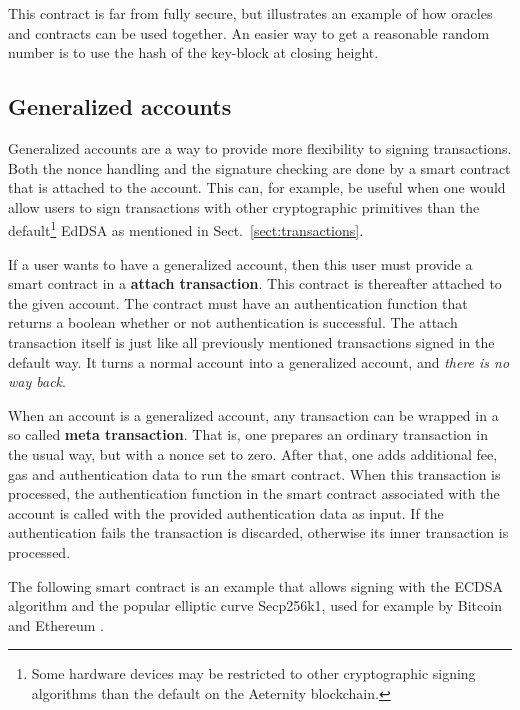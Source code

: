 This contract is far from fully secure, but illustrates an example of
how oracles and contracts can be used together. An easier way to
get a reasonable random number is to use the hash of the key-block at
closing height.




\subsection{Generalized accounts}
\label{sect:ga}

Generalized accounts are a way to provide more flexibility to signing
transactions. Both the nonce handling and the signature checking are
done by a smart contract that is attached to the account. This can,
for example, be useful when one would allow users to sign transactions with
other cryptographic primitives than the default\footnote{Some hardware
  devices may be restricted to other cryptographic signing algorithms
  than the default on the Aeternity blockchain.} EdDSA as mentioned in
Sect.\ \ref{sect:transactions}.

If a user wants to have a generalized account, then this user must
provide a smart contract in a \textbf{attach transaction}. This
contract is thereafter attached to the given account. The contract
must have an authentication function that returns a boolean whether or
not authentication is successful. The attach transaction itself is
just like all previously mentioned transactions signed in the default
way. It turns a normal account into a generalized account, and
\textit{there is no way back}.

When an account is a generalized account, any transaction can
be wrapped in a so called \textbf{meta transaction}. That is, one
prepares an ordinary transaction in the usual way, but with a nonce set to
zero. After that, one adds additional fee, gas and authentication data to
run the smart contract. When this transaction is processed, the
authentication function in the smart contract associated with the
account is called with the provided authentication data as input. If
the authentication fails the transaction is discarded, otherwise its
inner transaction is processed.

The following smart contract is an example that allows signing with
the ECDSA algorithm \cite{johnson2001elliptic} and the popular elliptic curve
Secp256k1, used for example by Bitcoin and Ethereum
\cite{bos2014elliptic, mayer2016ecdsa}.

